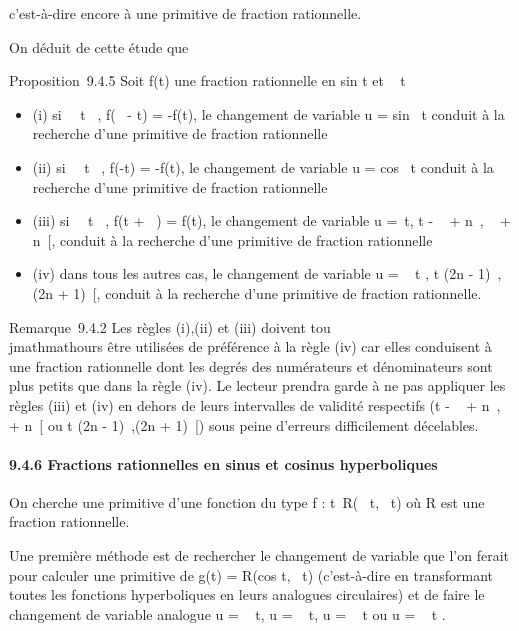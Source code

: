 \documentclass[]{article}
\begin{document}
c'est-à-dire encore à une primitive de fraction rationnelle.

On déduit de cette étude que

Proposition~9.4.5 Soit f(t) une fraction rationnelle en
sin t et \cos~ t

\begin{itemize}
\itemsep1pt\parskip0pt
\item
  (i) si \forall~~t \in {}~, f(\pi~ - t) = -f(t), le
  changement de variable u = sin~ t conduit à
  la recherche d'une primitive de fraction rationnelle
\item
  (ii) si \forall~~t \in {}~, f(-t) = -f(t), le changement
  de variable u = cos~ t conduit à la recherche
  d'une primitive de fraction rationnelle
\item
  (iii) si \forall~~t \in {}~, f(t + \pi~) = f(t), le
  changement de variable u =\
  \mathrmtg t, t \in{]} - \pi~  + n\pi~, \pi~ \over 2 + n\pi~{[}, conduit à la recherche
  d'une primitive de fraction rationnelle
\item
  (iv) dans tous les autres cas, le changement de variable u
  = \mathrmtg~  t
   , t \in{]}(2n - 1)\pi~,(2n + 1)\pi~{[}, conduit à la
  recherche d'une primitive de fraction rationnelle.
\end{itemize}

Remarque~9.4.2 Les règles (i),(ii) et (iii) doivent tou\\jmathmathours être
utilisées de préférence à la règle (iv) car elles conduisent à une
fraction rationnelle dont les degrés des numérateurs et dénominateurs
sont plus petits que dans la règle (iv). Le lecteur prendra garde à ne
pas appliquer les règles (iii) et (iv) en dehors de leurs intervalles de
validité respectifs (t \in{]} - \pi~  + n\pi~, \pi~
\over 2 + n\pi~{[} ou t \in{]}(2n - 1)\pi~,(2n + 1)\pi~{[}) sous
peine d'erreurs difficilement décelables.

\paragraph{9.4.6 Fractions rationnelles en sinus et cosinus
hyperboliques}

On cherche une primitive d'une fonction du type f :
t\mapsto~R(\mathrmch~
t,\mathrmsh~ t) où R est une
fraction rationnelle.

Une première méthode est de rechercher le changement de variable que
l'on ferait pour calculer une primitive de g(t) =
R(cos t,\sin~ t)
(c'est-à-dire en transformant toutes les fonctions hyperboliques en
leurs analogues circulaires) et de faire le changement de variable
analogue u = \mathrmsh~ t, u
= \mathrmch~ t, u
= \mathrmth~ t ou u
= \mathrmth~  t
 .
\end{document}
